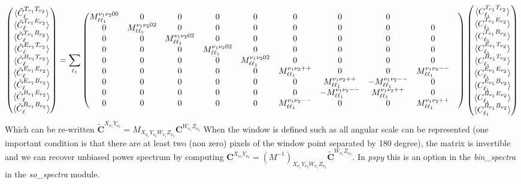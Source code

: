\documentclass[a4paper, 11pt]{article}
\def\ba{\begin{eqnarray}}
\def\ea{\end{eqnarray}}
\begin{document}
\tiny
\ba
 \begin{pmatrix} \langle \tilde{C}^{T_{\nu_{1}}T_{\nu_{2}}}_{\ell} \rangle  \cr \langle \tilde{C}^{T_{\nu_{1}}E_{\nu_{2}}}_{\ell} \rangle  \cr \langle \tilde{C}^{T_{\nu_{1}}B_{\nu_{2}}}_{\ell} \rangle  \cr \langle \tilde{C}^{E_{\nu_{1}}T_{\nu_{2}}}_{\ell} \rangle  \cr \langle \tilde{C}^{B_{\nu_{1}}T_{\nu_{2}}}_{\ell} \rangle  \cr \langle \tilde{C}^{E_{\nu_{1}}E_{\nu_{2}}}_{\ell} \rangle  \cr \langle \tilde{C}^{E_{\nu_{1}}B_{\nu_{2}}}_{\ell} \rangle \cr  \langle \tilde{C}^{B_{\nu_{1}}E_{\nu_{2}}}_{\ell} \rangle \cr \langle \tilde{C}^{B_{\nu_{1}}B_{\nu_{2}}}_{\ell} \rangle \end{pmatrix} = \sum_{\ell_{1}}
\begin{pmatrix} 
M^{\nu_{1}\nu_{2}00}_{\ell \ell_{1}} & 
0 &
0 &
0 &
0 &
0 &
0 &
0 &
\cr
0 &
M^{\nu_{1}\nu_{2}02}_{\ell \ell_{1}} & 
0 &
0 &
0 &
0 &
0 &
0 &
0 &
\cr
0 &
0 & 
M^{\nu_{1}\nu_{2}02}_{\ell \ell_{1}} &
0 &
0 &
0 &
0 &
0 &
0 &
\cr
0 &
0 & 
0 &
M^{\nu_{1}\nu_{2}02}_{\ell \ell_{1}} &
0 &
0 &
0 &
0 &
0 &
\cr
0 &
0 & 
0 &
0 &
M^{\nu_{1}\nu_{2}02}_{\ell \ell_{1}} &
0 &
0 &
0 &
0 &
\cr
0 &
0 &
0 &
0 &
0 &
M^{\nu_{1}\nu_{2}++}_{\ell \ell_{1}} & 
0 &
0 &
M^{\nu_{1}\nu_{2}--}_{\ell \ell_{1}} &
\cr
0 &
0 &
0 &
0 &
0 &
0 & 
M^{\nu_{1}\nu_{2}++}_{\ell \ell_{1}} &
-M^{\nu_{1}\nu_{2}--}_{\ell \ell_{1}} &
0 &
\cr
0 &
0 &
0 &
0 &
0 &
0& 
-M^{\nu_{1}\nu_{2}--}_{\ell \ell_{1}}  &
M^{\nu_{1}\nu_{2}++}_{\ell \ell_{1}}  &
0&
\cr
0 &
0 &
0 &
0 &
0 &
M^{\nu_{1}\nu_{2}--}_{\ell \ell_{1}} & 
0 &
0 &
M^{\nu_{1}\nu_{2}++}_{\ell \ell_{1}} &
\end{pmatrix}
\begin{pmatrix} \langle C^{T_{\nu_{1}}T_{\nu_{2}}}_{\ell_{1}} \rangle  \cr \langle C^{T_{\nu_{1}}E_{\nu_{2}}}_{\ell_{1}} \rangle  \cr \langle C^{T_{\nu_{1}}B_{\nu_{2}}}_{\ell_{1}} \rangle  \cr \langle C^{E_{\nu_{1}}T_{\nu_{2}}}_{\ell_{1}} \rangle  \cr \langle C^{B_{\nu_{1}}T_{\nu_{2}}}_{\ell_{1}} \rangle  \cr \langle C^{E_{\nu_{1}}E_{\nu_{2}}}_{\ell_{1}} \rangle  \cr \langle C^{E_{\nu_{1}}B_{\nu_{2}}}_{\ell_{1}} \rangle \cr  \langle C^{B_{\nu_{1}}E_{\nu_{2}}}_{\ell_{1}} \rangle \cr \langle C^{B_{\nu_{1}}B_{\nu_{2}}}_{\ell_{1}} \rangle \end{pmatrix}\ea
\normalsize
Which can be re-written $\bm{\tilde{C}}^{X_{\nu_{1}}Y_{\nu_{2}}}= M_{X_{\nu_{1}}Y_{\nu_{2}} W_{\nu_{1}}Z_{\nu_{2}}} \bm{C}^{W_{\nu_{1}}Z_{\nu_{2}}}$
When the window is defined such as all angular scale can be represented (one important condition is that there are at least two (non zero) pixels of the window point separated by 180 degree), the matrix is invertible and we can recover unbiased power spectrum by computing $\bm{C}^{X_{\nu_{1}}Y_{\nu_{2}}}= (M^{-1})_{X_{\nu_{1}}Y_{\nu_{2}} W_{\nu_{1}}Z_{\nu_{2}}} \bm{\tilde{C}}^{W_{\nu_{1}}Z_{\nu_{2}}}$. In   {\it pspy} this is an option in the {\it bin\_spectra} in the {\it so\_spectra} module.
\end{document}
